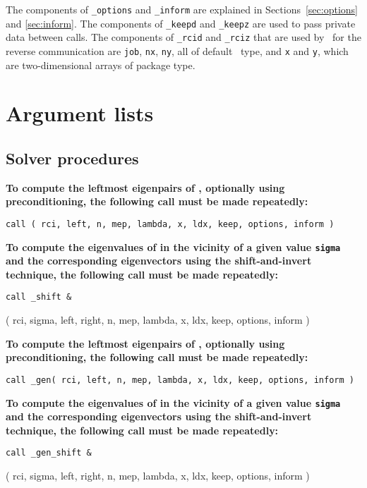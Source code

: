 The components of 
{\tt \solver\_options} and 
{\tt \solver\_inform} are explained
in Sections~\ref{sec:options} and \ref{sec:inform}. 
The components of {\tt \solver\_keepd} and {\tt \solver\_keepz} 
are used to pass 
private data between calls. 
The components of
{\tt \solver\_rcid} and 
{\tt \solver\_rciz} 
that are used by \fullpackagename\ 
for the reverse communication are
{\tt job},
{\tt nx},
{\tt ny}, all of default \Integer\ type,
and
{\tt x} and {\tt y},
which are 
two-dimensional arrays
of package type.


\section{Argument lists}

\subsection{Solver procedures}

{\bf
To compute %
the leftmost eigenpairs of ,
optionally using preconditioning,
the following call must be made repeatedly:
}

\medskip
{\tt call
\solver( rci, left, n, mep, lambda, x, ldx, keep, options, inform )
}

\medskip
\noindent
{\bf
To compute the eigenvalues of  %
in the vicinity of 
a given value {\tt sigma}
and the corresponding eigenvectors using the shift-and-invert technique,
the following call must be made repeatedly:
}

\medskip
{\tt call
\solver\_shift \&

\hspace{8mm} 
( rci, sigma, left, right, n, mep, lambda, x, ldx, keep, options, inform )
}

\medskip
\noindent
{\bf
To compute %
the leftmost eigenpairs of ,
optionally using preconditioning,
the following call must be made repeatedly:
}

\medskip
{\tt call
\solver\_gen( rci, left, n, mep, lambda, x, ldx, keep, options, inform )
}

\medskip
\noindent
{\bf
To compute the eigenvalues of  %
in the vicinity of 
a given value {\tt sigma}
and the corresponding eigenvectors using the shift-and-invert technique,
the following call must be made repeatedly:
}

\medskip
{\tt call
\solver\_gen\_shift \&

\hspace{8mm} 
( rci, sigma, left, right, n, mep, lambda, x, ldx, keep, options, inform )
}

